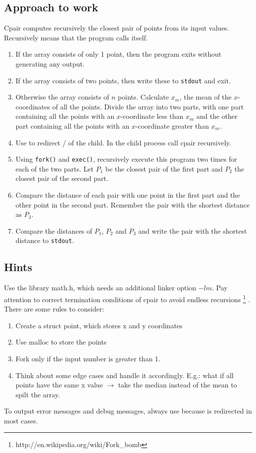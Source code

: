 \subsection*{Approach to work}
Cpair computes recursively the closest pair of points from its input values. Recursively means that the program calls itself. 
\begin{enumerate}
\item If the array consists of only 1 point, then the program exits without generating any output.

\item If the array consists of two points, then write these to \texttt{stdout} and exit.

\item Otherwise the array consists of $n$ points.
Calculate $x_m$, the mean of the $x$-coordinates of all the points.
Divide the array into two parts,
with one part containing all the points with an $x$-coordinate less than $x_m$
and the other part containing all the points with an $x$-coordinate greater than $x_m$.

 \item Use  to redirect / of the child. In the child process call cpair recursively.

\item Using \texttt{fork()} and \texttt{exec()},
recursively execute this program two times for each of the two parts.
Let $P_1$ be the closest pair of the first part and $P_2$ the closest pair of the second part.

\item Compare the distance of each pair with one point in the first part
and the other point in the second part.
Remember the pair with the shortest distance as $P_3$.

\item Compare the distances of $P_1$, $P_2$ and $P_3$
and write the pair with the shortest distance to \texttt{stdout}.
\end{enumerate}

\subsection*{Hints}
Use the library math.h, which needs an additional linker option $-lm$.
Pay attention to correct termination conditions of cpair to avoid endless recursions \footnote{http://en.wikipedia.org/wiki/Fork\_bomb} .
There are some rules to consider:
\begin{enumerate}
	\item Create a struct point, which stores x and y coordinates
	\item Use malloc to store the points
	\item Fork only if the input number is greater than 1.
	\item Think about some edge cases and handle it accordingly. E.g.: what if all points have the same x value $\rightarrow$ take the median instead of the mean to spilt the array.
\end{enumerate}

To output error messages and debug messages, always use
 because  is redirected in most cases.

\osueguidelinestwo


